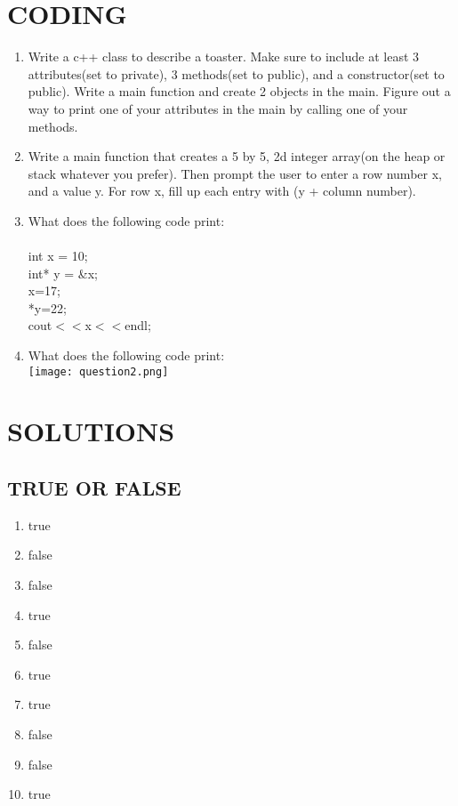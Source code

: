 \documentclass[a4paper]{article}
\begin{document}
\section{CODING}
\begin{enumerate}
    \item Write a c++ class to describe a toaster. Make sure to include at least
          3 attributes(set to private), 3 methods(set to public), and a 
          constructor(set to public). Write a main function and create 2 objects in the main. Figure out a way to print one 
          of your attributes in the main by calling one of your methods.
    \item Write a main function that creates a 5 by 5, 2d integer array(on the heap or 
          stack whatever you prefer). Then prompt the user to enter a row number x, and a value y. 
          For row x, fill up each entry with (y + column number).
    \item What does the following code print:\\\\
    \text{    }int x = 10;\\
    \text{    }int* y = \&x;\\
    \text{    }x=17;\\
    \text{    }*y=22;\\
    \text{    }cout$<<$x$<<$endl;\\
    \item What does the following code print:\\
    \texttt{[image: question2.png]}
    
\end{enumerate} 
\newpage

\section{SOLUTIONS}
\subsection{TRUE OR FALSE}
\begin{enumerate}
    \item true
    \item false
    \item false
    \item true
    \item false
    \item true
    \item true
    \item false
    \item false
    \item true
\end{enumerate}
\end{document}
